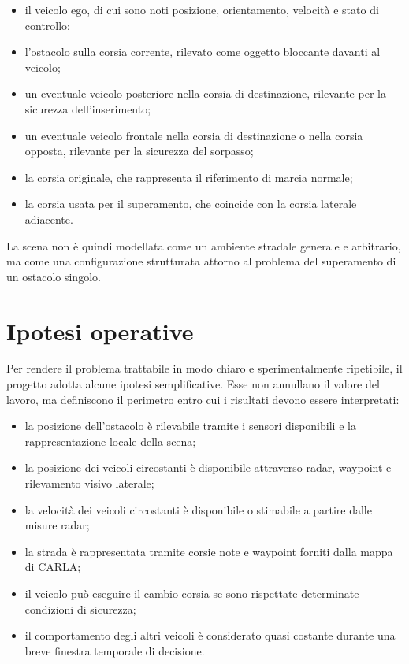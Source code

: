 \begin{itemize}
    \item il veicolo ego, di cui sono noti posizione, orientamento, velocità e stato di controllo;
    \item l'ostacolo sulla corsia corrente, rilevato come oggetto bloccante davanti al veicolo;
    \item un eventuale veicolo posteriore nella corsia di destinazione, rilevante per la sicurezza dell'inserimento;
    \item un eventuale veicolo frontale nella corsia di destinazione o nella corsia opposta, rilevante per la sicurezza del sorpasso;
    \item la corsia originale, che rappresenta il riferimento di marcia normale;
    \item la corsia usata per il superamento, che coincide con la corsia laterale adiacente.
\end{itemize}

La scena non è quindi modellata come un ambiente stradale generale e arbitrario, ma come una configurazione strutturata attorno al problema del superamento di un ostacolo singolo.

\section{Ipotesi operative}

Per rendere il problema trattabile in modo chiaro e sperimentalmente ripetibile, il progetto adotta alcune ipotesi semplificative. Esse non annullano il valore del lavoro, ma definiscono il perimetro entro cui i risultati devono essere interpretati:

\begin{itemize}
    \item la posizione dell'ostacolo è rilevabile tramite i sensori disponibili e la rappresentazione locale della scena;
    \item la posizione dei veicoli circostanti è disponibile attraverso radar, waypoint e rilevamento visivo laterale;
    \item la velocità dei veicoli circostanti è disponibile o stimabile a partire dalle misure radar;
    \item la strada è rappresentata tramite corsie note e waypoint forniti dalla mappa di CARLA;
    \item il veicolo può eseguire il cambio corsia se sono rispettate determinate condizioni di sicurezza;
    \item il comportamento degli altri veicoli è considerato quasi costante durante una breve finestra temporale di decisione.
\end{itemize}

